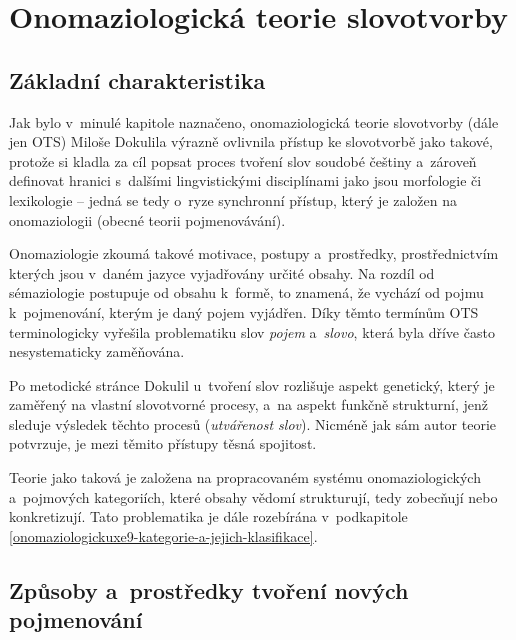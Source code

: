 \hypertarget{onomaziologickuxe1-teorie-slovotvorby}{%
\chapter{Onomaziologická teorie
slovotvorby}\label{onomaziologickuxe1-teorie-slovotvorby}}

\hypertarget{zuxe1kladnuxed-charakteristika}{%
\section{Základní
charakteristika}\label{zuxe1kladnuxed-charakteristika}}

Jak bylo v~minulé kapitole naznačeno, onomaziologická teorie slovotvorby
(dále jen OTS) Miloše Dokulila výrazně ovlivnila přístup ke slovotvorbě
jako takové, protože si kladla za cíl popsat proces tvoření slov soudobé
češtiny a~zároveň definovat hranici s~dalšími lingvistickými
disciplínami jako jsou morfologie či lexikologie -- jedná se tedy o~ryze
synchronní přístup, který je založen na onomaziologii (obecné teorii
pojmenovávání).~\parencite{enc-ots17}

Onomaziologie zkoumá takové motivace, postupy a~prostředky,
prostřednictvím kterých jsou v~daném jazyce vyjadřovány určité obsahy.
Na rozdíl od sémaziologie postupuje od obsahu k~formě, to znamená, že
vychází od pojmu k~pojmenování, kterým je daný pojem vyjádřen.
\parencite{enc-onomaz17} Díky těmto termínům OTS terminologicky vyřešila
problematiku slov \emph{pojem} a~\emph{slovo}, která byla dříve často
nesystematicky zaměňována.~\parencite[267]{rousinova07}

Po metodické stránce Dokulil u~tvoření slov rozlišuje aspekt genetický,
který je zaměřený na vlastní slovotvorné procesy, a~na aspekt funkčně
strukturní, jenž sleduje výsledek těchto procesů (\emph{utvářenost
slov}). Nicméně jak sám autor teorie potvrzuje, je mezi těmito přístupy
těsná spojitost.~\parencite[9]{dokulil62}

Teorie jako taková je založena na propracovaném systému
onomaziologických a~pojmových kategoriích, které obsahy vědomí
strukturují, tedy zobecňují nebo konkretizují.
\parencite{enc-onomaz-kateg17} Tato problematika je dále rozebírána
v~podkapitole \ref{onomaziologickuxe9-kategorie-a-jejich-klasifikace}.

\hypertarget{zpux16fsoby-a-prostux159edky-tvoux159enuxed-novuxfdch-pojmenovuxe1nuxed}{%
\section{Způsoby a~prostředky tvoření nových
pojmenování}\label{zpux16fsoby-a-prostux159edky-tvoux159enuxed-novuxfdch-pojmenovuxe1nuxed}}

